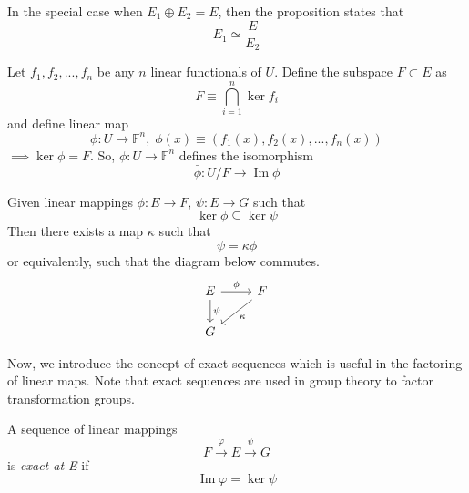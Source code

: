 \documentclass{article}
\DeclareMathOperator{\im}{Im}
\begin{document}
    \begin{corollary}
      In the special case when $E_1 \oplus E_2 = E$, then the proposition states that 
      \begin{equation}
        E_1 \simeq \frac{E}{E_2}
      \end{equation}
    \end{corollary}

    Let $f_1, f_2, ..., f_n$ be any $n$ linear functionals of $U$. Define the subspace $F \subset E$ as 
    \begin{equation}
      F \equiv \bigcap_{i=1}^n \ker{f_i}
    \end{equation}
    and define linear map 
    \begin{equation}
      \phi: U \longrightarrow \mathbb{F}^n, \;\phi(x) \equiv (f_1(x), f_2(x), ..., f_n(x))
    \end{equation}
    $\implies \ker{\phi} = F$. So, $\phi: U \longrightarrow \mathbb{F}^n$ defines the isomorphism 
    \begin{equation}
      \bar{\phi}: U / F \longrightarrow \im{\phi}
    \end{equation}

    \begin{proposition}
      Given linear mappings $\phi: E \longrightarrow F$, $\psi: E \longrightarrow G$ such that
      \begin{equation}
        \ker{\phi} \subseteq \ker{\psi}
      \end{equation}
      Then there exists a map $\kappa$ such that 
      \begin{equation}
        \psi = \kappa \phi
      \end{equation}
      or equivalently, such that the diagram below commutes. 
      \[\begin{tikzcd} 
          E \arrow{r}{\phi} \arrow{d}{\psi} & F \arrow{dl}{\kappa} \\
          G 
      \end{tikzcd}\]
    \end{proposition}

    Now, we introduce the concept of exact sequences which is useful in the factoring of linear maps. Note that exact sequences are used in group theory to factor transformation groups. 

    \begin{definition}
      A sequence of linear mappings 
      \begin{equation}
        F \xrightarrow{\varphi} E \xrightarrow{\psi} G
      \end{equation}
      is \textit{exact at E} if
      \begin{equation}
        \im{\varphi} = \ker{\psi}
      \end{equation}
    \end{definition}
\end{document}
